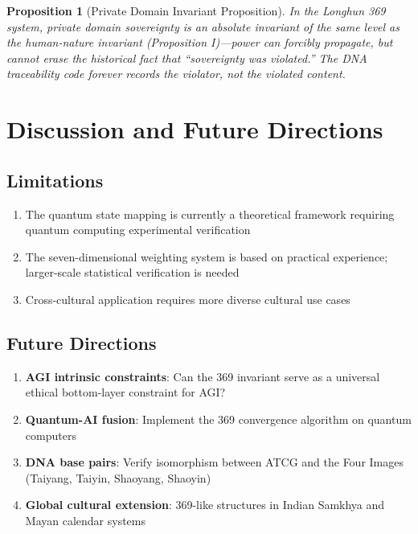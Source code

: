 \documentclass[conference]{IEEEtran}
\newtheorem{proposition}[theorem]{Proposition}
\theoremstyle{remark}
\begin{document}
\begin{proposition}[Private Domain Invariant Proposition]
In the Longhun 369 system, private domain sovereignty is an absolute invariant of the same level as the human-nature invariant (Proposition I)---power can forcibly propagate, but cannot erase the historical fact that ``sovereignty was violated.'' The DNA traceability code forever records the violator, not the violated content.
\end{proposition}

\section{Discussion and Future Directions}

\subsection{Limitations}
\begin{enumerate}[nosep]
\item The quantum state mapping is currently a theoretical framework requiring quantum computing experimental verification
\item The seven-dimensional weighting system is based on practical experience; larger-scale statistical verification is needed
\item Cross-cultural application requires more diverse cultural use cases
\end{enumerate}

\subsection{Future Directions}
\begin{enumerate}[nosep]
\item \textbf{AGI intrinsic constraints}: Can the 369 invariant serve as a universal ethical bottom-layer constraint for AGI?
\item \textbf{Quantum-AI fusion}: Implement the 369 convergence algorithm on quantum computers
\item \textbf{DNA base pairs}: Verify isomorphism between ATCG and the Four Images (Taiyang, Taiyin, Shaoyang, Shaoyin)
\item \textbf{Global cultural extension}: 369-like structures in Indian Samkhya and Mayan calendar systems
\end{enumerate}
\end{document}
